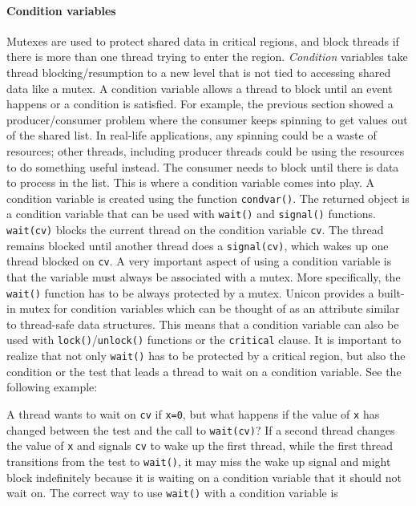 \paragraph{Condition variables}

Mutexes are used to protect shared data in critical regions, and block threads
if there is more than one thread trying to enter the region.  \emph{Condition}
variables take thread blocking/resumption to a new level that is not tied to
accessing shared data like a mutex. A condition variable allows a thread to
block until an event happens or a condition is satisfied. For example, the
previous section showed a producer/consumer problem where the consumer keeps
spinning to get values out of the shared list. In real-life applications, any
spinning could be a waste of resources; other threads, including producer
threads could be using the resources to do something useful instead. The
consumer needs to block until there is data to process in the list. This is
where a condition variable comes into play.  A condition variable is created
using the function \texttt{condvar()}. The returned object is a condition
variable that can be used with \texttt{wait()} and \texttt{signal()}
functions. \texttt{wait(cv)} blocks the current thread on the condition variable
\texttt{cv}. The thread remains blocked until another thread does a
\texttt{signal(cv)}, which wakes up one thread blocked on \texttt{cv}.  A very
important aspect of using a condition variable is that the variable must always
be associated with a mutex. More specifically, the \texttt{wait()} function has
to be always protected by a mutex.  Unicon provides a built-in mutex for
condition variables which can be thought of as an attribute similar to
thread-safe data structures. This means that a condition variable can also be
used with \texttt{lock()}/\texttt{unlock()} functions or the \texttt{critical} clause. It
is important to realize that not only \texttt{wait()} has to be protected by a
critical region, but also the condition or the test that leads a thread to wait
on a condition variable.  See the following example:


A thread wants to wait on \texttt{cv} if \texttt{x=0}, but what happens if the
value of \texttt{x} has changed between the test and the call to
\texttt{wait(cv)}?  If a second thread changes the value of \texttt{x} and
signals \texttt{cv} to wake up the first thread, while the first thread
transitions from the test to \texttt{wait()}, it may miss the wake up signal and
might block indefinitely because it is waiting on a condition variable that it
should not wait on.  The correct way to use \texttt{wait()} with a condition
variable is

